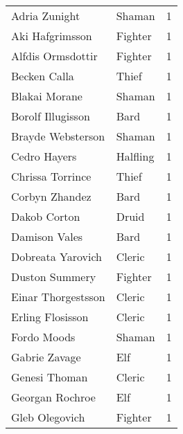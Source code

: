 \begin{tcolorbox}[breakable, title=Index by level]
\begin{supertabular}{p{0.6\columnwidth}lr}
Adria Zunight                                      & Shaman          &     1\\
Aki Hafgrimsson                                    & Fighter         &     1\\
Alfdis Ormsdottir                                  & Fighter         &     1\\
Becken Calla                                       & Thief           &     1\\
Blakai Morane                                      & Shaman          &     1\\
Borolf Illugisson                                  & Bard            &     1\\
Brayde Websterson                                  & Shaman          &     1\\
Cedro Hayers                                       & Halfling        &     1\\
Chrissa Torrince                                   & Thief           &     1\\
Corbyn Zhandez                                     & Bard            &     1\\
Dakob Corton                                       & Druid           &     1\\
Damison Vales                                      & Bard            &     1\\
Dobreata Yarovich                                  & Cleric          &     1\\
Duston Summery                                     & Fighter         &     1\\
Einar Thorgestsson                                 & Cleric          &     1\\
Erling Flosisson                                   & Cleric          &     1\\
Fordo Moods                                        & Shaman          &     1\\
Gabrie Zavage                                      & Elf             &     1\\
Genesi Thoman                                      & Cleric          &     1\\
Georgan Rochroe                                    & Elf             &     1\\
Gleb Olegovich                                     & Fighter         &     1\\

\end{supertabular}
\end{tcolorbox}
